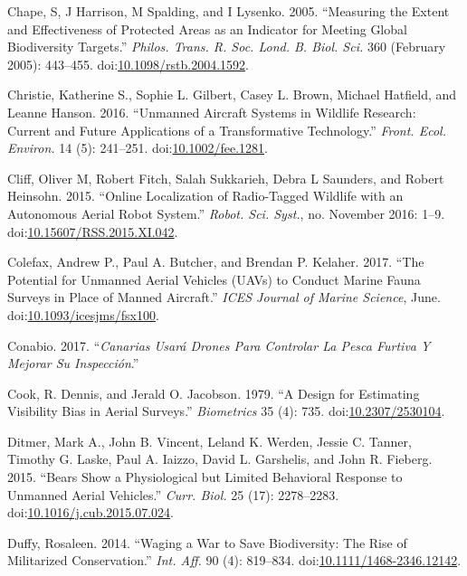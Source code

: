 \documentclass[]{interact}
\theoremstyle{plain}%
\theoremstyle{definition}
\theoremstyle{remark}
\begin{document}
\hypertarget{ref-chape_measuring_2005}{}
Chape, S, J Harrison, M Spalding, and I Lysenko. 2005. ``Measuring the
Extent and Effectiveness of Protected Areas as an Indicator for Meeting
Global Biodiversity Targets.'' \emph{Philos. Trans. R. Soc. Lond. B.
Biol. Sci.} 360 (February 2005): 443--455.
doi:\href{https://doi.org/10.1098/rstb.2004.1592}{10.1098/rstb.2004.1592}.

\hypertarget{ref-christie_unmanned_2016}{}
Christie, Katherine S., Sophie L. Gilbert, Casey L. Brown, Michael
Hatfield, and Leanne Hanson. 2016. ``Unmanned Aircraft Systems in
Wildlife Research: Current and Future Applications of a Transformative
Technology.'' \emph{Front. Ecol. Environ.} 14 (5): 241--251.
doi:\href{https://doi.org/10.1002/fee.1281}{10.1002/fee.1281}.

\hypertarget{ref-cliff_online_2015}{}
Cliff, Oliver M, Robert Fitch, Salah Sukkarieh, Debra L Saunders, and
Robert Heinsohn. 2015. ``Online Localization of Radio-Tagged Wildlife
with an Autonomous Aerial Robot System.'' \emph{Robot. Sci. Syst.}, no.
November 2016: 1--9.
doi:\href{https://doi.org/10.15607/RSS.2015.XI.042}{10.15607/RSS.2015.XI.042}.

\hypertarget{ref-colefax_potential_2017}{}
Colefax, Andrew P., Paul A. Butcher, and Brendan P. Kelaher. 2017. ``The
Potential for Unmanned Aerial Vehicles (UAVs) to Conduct Marine Fauna
Surveys in Place of Manned Aircraft.'' \emph{ICES Journal of Marine
Science}, June.
doi:\href{https://doi.org/10.1093/icesjms/fsx100}{10.1093/icesjms/fsx100}.

\hypertarget{ref-Conabio2017}{}
Conabio. 2017. ``\emph{Canarias Usará Drones Para Controlar La Pesca
Furtiva Y Mejorar Su Inspección}.''

\hypertarget{ref-cook_design_1979}{}
Cook, R. Dennis, and Jerald O. Jacobson. 1979. ``A Design for Estimating
Visibility Bias in Aerial Surveys.'' \emph{Biometrics} 35 (4): 735.
doi:\href{https://doi.org/10.2307/2530104}{10.2307/2530104}.

\hypertarget{ref-ditmer_bears_2015}{}
Ditmer, Mark A., John B. Vincent, Leland K. Werden, Jessie C. Tanner,
Timothy G. Laske, Paul A. Iaizzo, David L. Garshelis, and John R.
Fieberg. 2015. ``Bears Show a Physiological but Limited Behavioral
Response to Unmanned Aerial Vehicles.'' \emph{Curr. Biol.} 25 (17):
2278--2283.
doi:\href{https://doi.org/10.1016/j.cub.2015.07.024}{10.1016/j.cub.2015.07.024}.

\hypertarget{ref-duffy_waging_2014}{}
Duffy, Rosaleen. 2014. ``Waging a War to Save Biodiversity: The Rise of
Militarized Conservation.'' \emph{Int. Aff.} 90 (4): 819--834.
doi:\href{https://doi.org/10.1111/1468-2346.12142}{10.1111/1468-2346.12142}.
\end{document}
